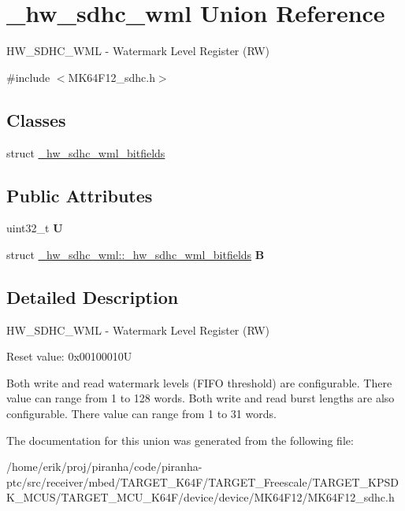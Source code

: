 \hypertarget{union__hw__sdhc__wml}{}\section{\+\_\+hw\+\_\+sdhc\+\_\+wml Union Reference}
\label{union__hw__sdhc__wml}


H\+W\+\_\+\+S\+D\+H\+C\+\_\+\+W\+ML -\/ Watermark Level Register (RW)  




{\ttfamily \#include $<$M\+K64\+F12\+\_\+sdhc.\+h$>$}

\subsection*{Classes}
\begin{DoxyCompactItemize}
\item 
struct \hyperlink{struct__hw__sdhc__wml_1_1__hw__sdhc__wml__bitfields}{\+\_\+hw\+\_\+sdhc\+\_\+wml\+\_\+bitfields}
\end{DoxyCompactItemize}
\subsection*{Public Attributes}
\begin{DoxyCompactItemize}
\item 
uint32\+\_\+t {\bfseries U}\hypertarget{union__hw__sdhc__wml_a3fb16a661d4c2245c55b39a09973b97c}{}\label{union__hw__sdhc__wml_a3fb16a661d4c2245c55b39a09973b97c}

\item 
struct \hyperlink{struct__hw__sdhc__wml_1_1__hw__sdhc__wml__bitfields}{\+\_\+hw\+\_\+sdhc\+\_\+wml\+::\+\_\+hw\+\_\+sdhc\+\_\+wml\+\_\+bitfields} {\bfseries B}\hypertarget{union__hw__sdhc__wml_a8c9678ac5ef8c338f1521ddf40aaaa15}{}\label{union__hw__sdhc__wml_a8c9678ac5ef8c338f1521ddf40aaaa15}

\end{DoxyCompactItemize}


\subsection{Detailed Description}
H\+W\+\_\+\+S\+D\+H\+C\+\_\+\+W\+ML -\/ Watermark Level Register (RW) 

Reset value\+: 0x00100010U

Both write and read watermark levels (F\+I\+FO threshold) are configurable. There value can range from 1 to 128 words. Both write and read burst lengths are also configurable. There value can range from 1 to 31 words. 

The documentation for this union was generated from the following file\+:\begin{DoxyCompactItemize}
\item 
/home/erik/proj/piranha/code/piranha-\/ptc/src/receiver/mbed/\+T\+A\+R\+G\+E\+T\+\_\+\+K64\+F/\+T\+A\+R\+G\+E\+T\+\_\+\+Freescale/\+T\+A\+R\+G\+E\+T\+\_\+\+K\+P\+S\+D\+K\+\_\+\+M\+C\+U\+S/\+T\+A\+R\+G\+E\+T\+\_\+\+M\+C\+U\+\_\+\+K64\+F/device/device/\+M\+K64\+F12/M\+K64\+F12\+\_\+sdhc.\+h\end{DoxyCompactItemize}
